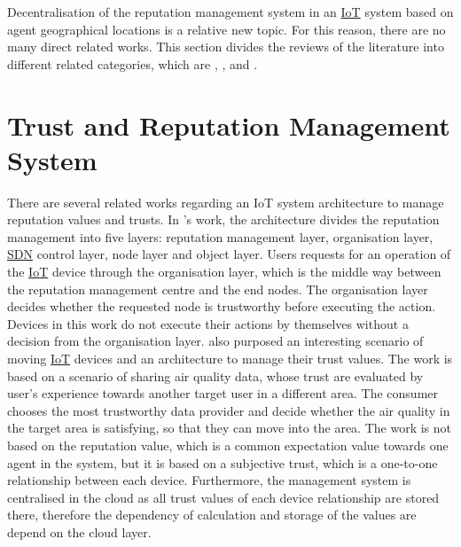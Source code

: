 \npara Decentralisation of the reputation management system in an \hyperref[Acronym-IoT]{IoT} system based on agent geographical locations is a relative new topic.
For this reason, there are no many direct related works.
This section divides the reviews of the literature into different related categories, which are \textit{}, \textit{}, and \textit{}.

\section{Trust and Reputation Management System} \label{RelatedWorks-ReputationManagementSystem}

\npara There are several related works regarding an IoT system architecture to manage reputation values and trusts.
In \cite{TrustArchitectureReputationEvaluation}'s work, the architecture divides the reputation management into five layers: reputation management layer, organisation layer, \hyperref[Acronym-SDN]{SDN} control layer, node layer and object layer.
Users requests for an operation of the \hyperref[Acronym-IoT]{IoT} device through the organisation layer, which is the middle way between the reputation management centre and the end nodes.
The organisation layer decides whether the requested node is trustworthy before executing the action.
Devices in this work do not execute their actions by themselves without a decision from the organisation layer.
\cite{TrustBasedAirQualitySensing} also purposed an interesting scenario of moving \hyperref[Acronym-IoT]{IoT} devices and an architecture to manage their trust values.
The work is based on a scenario of sharing air quality data, whose trust are evaluated by user's experience towards another target user in a different area.
The consumer chooses the most trustworthy data provider and decide whether the air quality in the target area is satisfying, so that they can move into the area.
The work is not based on the reputation value, which is a common expectation value towards one agent in the system, but it is based on a subjective trust, which is a one-to-one relationship between each device.
Furthermore, the management system is centralised in the cloud as all trust values of each device relationship are stored there, therefore the dependency of calculation and storage of the values are depend on the cloud layer.

